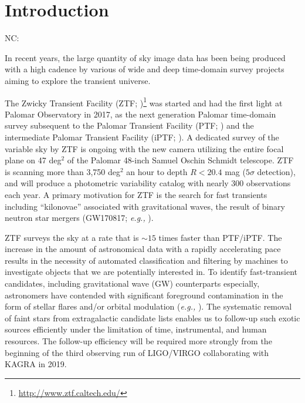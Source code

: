 \documentclass[twocolumn]{aastex62}
\newcommand{\NC}[1]{{\color{brown} NC: {#1}}}
\begin{document}

\section{Introduction}\label{sec:intro}
\NC{
In recent years, the large quantity of sky image data has been being produced with a high cadence 
by various of wide and deep time-domain survey projects aiming to explore the transient universe. 

The Zwicky Transient Facility (ZTF; 
\citealt{Kulkarni12, Bellm14, Smith14, Dekany16, Bellm17})\footnote{\url{http://www.ztf.caltech.edu/}} 
was started and had the first light at Palomar Observatory in 2017, 
as the next generation Palomar time-domain survey 
subsequent to the Palomar Transient Facility (PTF; \citealt{Rau09, Law09}) 
and the intermediate Palomar Transient Facility (iPTF; \citealt{Kulkarni13}). 
A dedicated survey of the variable sky by ZTF is ongoing with the new camera 
utilizing the entire focal plane on 47 deg$^2$ of the Palomar 48-inch Samuel Oschin Schmidt telescope. 
ZTF is scanning more than 3,750 deg$^2$ an hour to depth $R < 20.4$ mag ($5\sigma$ detection), 
and will produce a photometric variability catalog with nearly 300 observations each year. 
A primary motivation for ZTF is the search for fast transients 
including ``kilonovae'' 
associated with gravitational waves, 
the result of binary neutron star mergers 
(GW170817; {\it e.g.,} \citealt{Abbott17, Cowperthwaite17, Lipunov17, Kasliwal17, Utsumi17, Tanaka17}). 

ZTF surveys the sky at a rate that is $\sim15$ times faster than PTF/iPTF. 
The increase in the amount of astronomical data with a rapidly accelerating pace 
results in the necessity of automated classification and filtering by machines to investigate objects 
that we are potentially interested in. 
To identify fast-transient candidates, including gravitational wave (GW) counterparts especially, 
astronomers have contended with significant foreground contamination in the form of stellar flares 
and/or orbital modulation ({\it e.g.,} \citealt{Kulkarni06, Berger12, Kasliwal16}). 
The systematic removal of faint stars from extragalactic candidate lists 
enables us to follow-up such exotic sources efficiently under the limitation of time, instrumental, and human resources. 
The follow-up efficiency will be required more strongly from the beginning of the third observing run of LIGO/VIRGO 
collaborating with KAGRA in 2019. 

}
\end{document}
